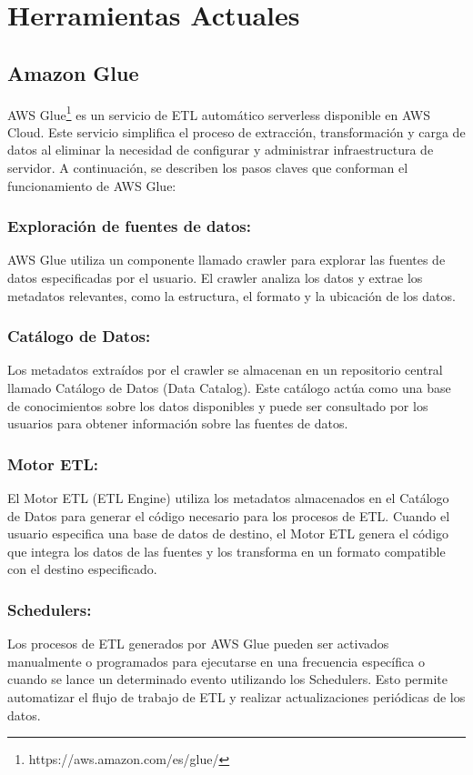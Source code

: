 \section{Herramientas Actuales} \label{section:actual_tools}

\subsection{Amazon Glue}

AWS Glue\footnote{https://aws.amazon.com/es/glue/} es un servicio de ETL automático serverless disponible en AWS Cloud. Este servicio simplifica el proceso de 
extracción, transformación y carga de datos al eliminar la necesidad de configurar y administrar infraestructura de 
servidor. A continuación, se describen los pasos claves que conforman el funcionamiento de AWS Glue:

\subsubsection{Exploración de fuentes de datos:}
AWS Glue utiliza un componente llamado crawler para explorar las fuentes de datos 
especificadas por el usuario. El crawler analiza los datos y extrae los metadatos relevantes, como la estructura, el 
formato y la ubicación de los datos.

\subsubsection{Catálogo de Datos:}
Los metadatos extraídos por el crawler se almacenan en un repositorio central llamado Catálogo de 
Datos (Data Catalog). Este catálogo actúa como una base de conocimientos sobre los datos disponibles y puede ser 
consultado por los usuarios para obtener información sobre las fuentes de datos.

\subsubsection{Motor ETL:}
El Motor ETL (ETL Engine) utiliza los metadatos almacenados en el Catálogo de Datos para generar el código 
necesario para los procesos de ETL. Cuando el usuario especifica una base de datos de destino, el Motor ETL genera el 
código que integra los datos de las fuentes y los transforma en un formato compatible con el destino especificado.

\subsubsection{Schedulers:}
Los procesos de ETL generados por AWS Glue pueden ser activados manualmente o programados para ejecutarse en 
una frecuencia específica o cuando se lance un determinado evento utilizando los Schedulers. Esto permite automatizar el 
flujo de trabajo de ETL y realizar actualizaciones periódicas de los datos.


